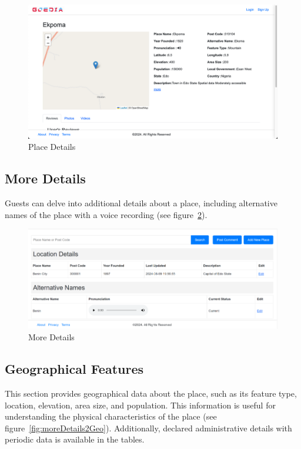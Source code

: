 \begin{figure}[htb]
    \centering
    \includegraphics[width=\textwidth]{placeDetails.png}
    \caption{Place Details}
    \label{fig:placeDetails}
\end{figure}

\subsection{More Details}
Guests can delve into additional details about a place, including alternative names of the place with a voice recording (see figure~\ref{fig:moreDetails}).

\begin{figure}[htb]
    \centering
    \includegraphics[width=\textwidth]{moreDetails.png}
    \caption{More Details}
    \label{fig:moreDetails}
\end{figure}

\subsection{Geographical Features}
This section provides geographical data about the place, such as its feature type, location, elevation, area size, and population. This information is useful for understanding the physical characteristics of the place (see figure~\ref{fig:moreDetails2Geo}). Additionally, declared administrative details with periodic data is available in the tables.

